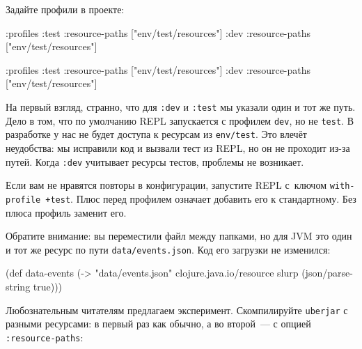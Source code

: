 
\linegap

\noindent
Задайте профили в проекте:

\ifnarrow

\begin{english}
  \begin{clojure}
:profiles
  {:test {:resource-paths
          ["env/test/resources"]}
   :dev {:resource-paths
         ["env/test/resources"]}}
  \end{clojure}
\end{english}

\else

\begin{english}
  \begin{clojure}
:profiles
{:test {:resource-paths ["env/test/resources"]}
        :dev {:resource-paths ["env/test/resources"]}}
  \end{clojure}
\end{english}

\fi

На первый взгляд, странно, что для \verb|:dev| и \verb|:test| мы указали один и
тот же путь. Дело в том, что по умолчанию REPL запускается с профилем
\verb|dev|, но не \verb|test|. В разработке у нас не будет доступа к ресурсам из
\verb|env/test|. Это влечёт неудобства: мы исправили код и вызвали тест из REPL,
но он не проходит из-за путей. Когда \verb|:dev| учитывает ресурсы тестов,
проблемы не возникает.


\mnoindent
Если вам не нравятся повторы в конфигурации, запустите REPL с~ключом
\verb|with-profile +test|. Плюс перед профилем означает добавить его к
стандартному. Без плюса профиль заменит его.


Обратите внимание: вы переместили файл между папками, но для JVM это один и тот
же ресурс по пути \verb|data/events.json|. Код его загрузки не изменился:

\begin{english}
  \begin{clojure}
(def data-events
  (-> "data/events.json"
      clojure.java.io/resource
      slurp
      (json/parse-string true)))
  \end{clojure}
\end{english}

Любознательным читателям предлагаем эксперимент. Скомпилируйте \verb|uberjar|
с разными ресурсами: в первый раз как обычно, а во второй~--- с опцией
\verb|:resource-paths|:


